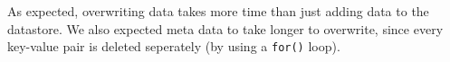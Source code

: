 As expected, overwriting data takes more time than just adding data to the
datastore. We also expected meta data to take longer to overwrite, since every
key-value pair is deleted seperately (by using a \texttt{for()} loop).
% 
% 
% 
% 
% 
% 
